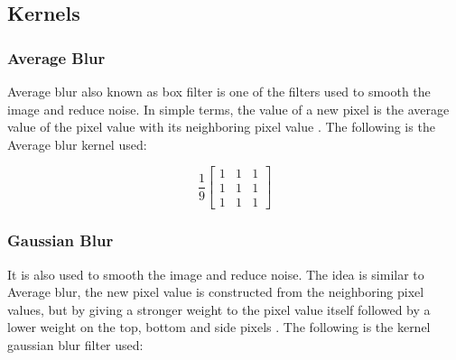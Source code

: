 \subsection{Kernels}

\subsubsection{Average Blur}

Average blur also known as box filter is one of the filters used to smooth the image and reduce noise. In simple terms, the value of a new pixel is the average value of the pixel value with its neighboring pixel value \cite{pdf:marcin}. The following is the Average blur kernel used:

\begin{equation}
    \label{kernel:average}
    \frac{1}{9} \left[
    \begin{matrix}
 1 & 1 & 1 \\
 1 & 1 & 1 \\
 1 & 1 & 1
    \end{matrix}
    \right]
\end{equation}

\subsubsection{Gaussian Blur}

It is also used to smooth the image and reduce noise. The idea is similar to Average blur, the new pixel value is constructed from the neighboring pixel values, but by giving a stronger weight to the pixel value itself followed by a lower weight on the top, bottom and side pixels \cite{soa:dmitry}. The following is the kernel gaussian blur filter used:


